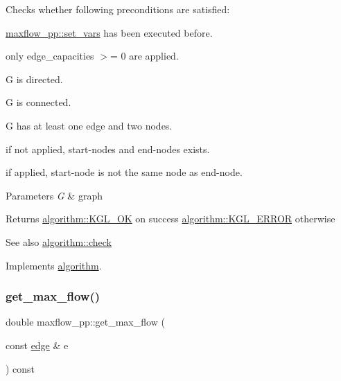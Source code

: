 Checks whether following preconditions are satisfied\+: 
\begin{DoxyItemize}
\item \mbox{\hyperlink{classmaxflow__pp_ac77f4c613efe7857e053f9bfb103dc3e}{maxflow\+\_\+pp\+::set\+\_\+vars}} has been executed before. 
\item only edge\+\_\+capacities $>$= 0 are applied. 
\item {\ttfamily G} is directed. 
\item {\ttfamily G} is connected. 
\item {\ttfamily G} has at least one edge and two nodes. 
\item if not applied, start-\/nodes and end-\/nodes exists. 
\item if applied, start-\/node is not the same node as end-\/node. 
\end{DoxyItemize}


\begin{DoxyParams}{Parameters}
{\em G} & graph \\
\hline
\end{DoxyParams}
\begin{DoxyReturn}{Returns}
{\ttfamily \mbox{\hyperlink{classalgorithm_af1a0078e153aa99c24f9bdf0d97f6710aae4c1cd7fe8d8cf4b143241a6e7c31cf}{algorithm\+::\+K\+G\+L\+\_\+\+OK}}} on success {\ttfamily \mbox{\hyperlink{classalgorithm_af1a0078e153aa99c24f9bdf0d97f6710ae67bf27b2ef31f73e545a7f9f4a69556}{algorithm\+::\+K\+G\+L\+\_\+\+E\+R\+R\+OR}}} otherwise 
\end{DoxyReturn}
\begin{DoxySeeAlso}{See also}
\mbox{\hyperlink{classalgorithm_a05c0f25463eb35a77b2d73fc06bb2c0e}{algorithm\+::check}} 
\end{DoxySeeAlso}


Implements \mbox{\hyperlink{classalgorithm_a05c0f25463eb35a77b2d73fc06bb2c0e}{algorithm}}.

\mbox{\label{classmaxflow__pp_ac561a61619f363ef5d9b8fc5cfb10a5f}} 
\subsubsection{\texorpdfstring{get\+\_\+max\+\_\+flow()}{get\_max\_flow()}\hspace{0.1cm}{\footnotesize\ttfamily [1/2]}}
{\footnotesize\ttfamily double maxflow\+\_\+pp\+::get\+\_\+max\+\_\+flow (\begin{DoxyParamCaption}\item[{const \mbox{\hyperlink{classedge}{edge}} \&}]{e }\end{DoxyParamCaption}) const}

